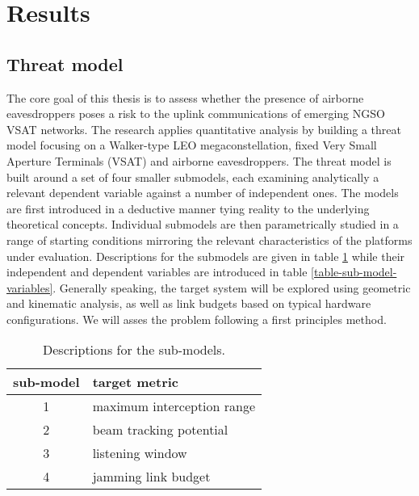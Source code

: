 \documentclass[english, 12pt, a4paper, elec, utf8, a-1b, online]{aaltothesis}
\begin{document}
\clearpage

\section{Results}

\subsection{Threat model}
The core goal of this thesis is to assess whether the presence of airborne eavesdroppers poses a risk to the uplink communications of emerging NGSO VSAT networks.
The research applies quantitative analysis by building a threat model focusing on a Walker-type LEO megaconstellation, fixed Very Small Aperture Terminals (VSAT) and airborne eavesdroppers.
The threat model is built around a set of four smaller submodels, each examining analytically a relevant dependent variable against a number of independent ones.
The models are first introduced in a deductive manner tying reality to the underlying theoretical concepts.
Individual submodels are then parametrically studied in a range of starting conditions mirroring the relevant characteristics of the platforms under evaluation.
Descriptions for the submodels are given in table \ref{table-sub-model-descriptions} while their independent and dependent variables are introduced in table \ref{table-sub-model-variables}. Generally speaking, the target system will be explored using geometric and kinematic analysis, as well as link budgets based on typical hardware configurations.
We will asses the problem following a first principles method. %






\begin{table}[h]
  \centering
  \caption{Descriptions for the sub-models.}
  \begin{tabular}{@{}cl@{}}
  \toprule
  \multicolumn{1}{l}{sub-model} & target metric              \\ \midrule
  1                             & maximum interception range \\
  2                             & beam tracking potential    \\
  3                             & listening window           \\
  4                             & jamming link budget        \\ \bottomrule
  \end{tabular}
  \label{table-sub-model-descriptions}
\end{table}
\end{document}
